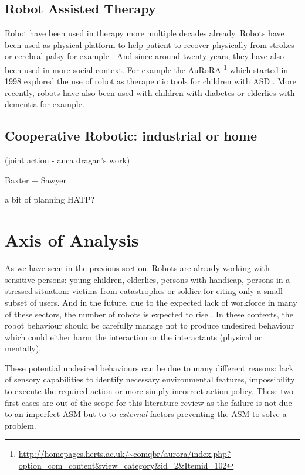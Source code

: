	\subsection{Robot Assisted Therapy}
	Robot have been used in therapy more multiple decades already. Robots have been used as physical platform to help patient to recover physically from strokes or cerebral palsy for example . And since around twenty years, they have also been used in more social context. For example the AuRoRA \footnote{\url{http://homepages.herts.ac.uk/~comqbr/aurora/index.php?option=com_content&view=category&id=2&Itemid=102}} which started in 1998 explored the use of robot as therapeutic tools for children with ASD \cite{dautenhahn1999}. More recently, robots have also been used with children with diabetes  or elderlies with dementia \cite{wada2005psychological} for example.

	
	\subsection{Cooperative Robotic: industrial or home }
	
	
	(joint action - anca dragan's work)
	
	Baxter + Sawyer

	a bit of planning HATP?
	
\section{Axis of Analysis}

As we have seen in the previous section. Robots are already working with sensitive persons: young children, elderlies, persons with handicap, persons in a stressed situation: victims from catastrophes or soldier for citing only a small subset of users. And in the future, due to the expected lack of workforce in many of these sectors, the number of robots is expected to rise . In these contexts, the robot behaviour should be carefully manage not to produce undesired behaviour which could either harm the interaction or the interactants (physical or mentally).

These potential undesired behaviours can be due to many different reasons: lack of sensory capabilities to identify necessary environmental features, impossibility to execute the required action or more simply incorrect action policy. These two first cases are out of the scope for this literature review as the failure is not due to an imperfect ASM but to to \emph{external} factors preventing the ASM to solve a problem. 


